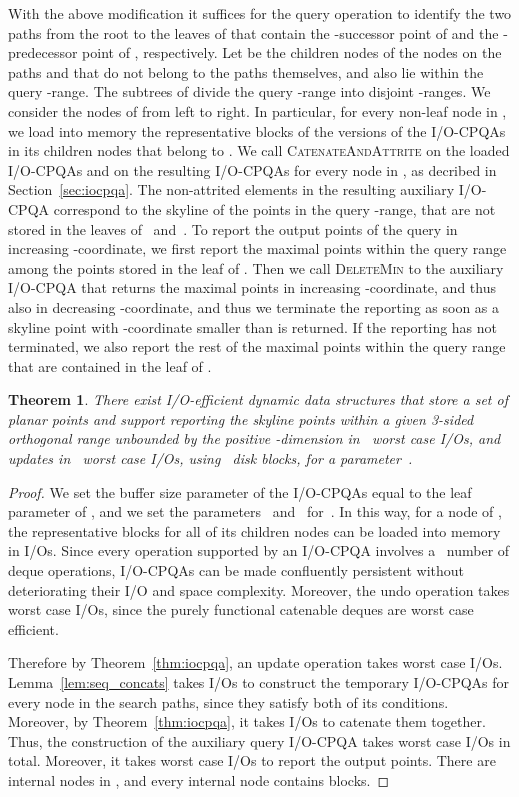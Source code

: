 \documentclass[]{article}
\newtheorem{theorem}{Theorem}[section]
\begin{document}
With the above modification it suffices for the query operation to identify the
two paths  from the root to the leaves of  that contain the
-successor point of  and the -predecessor point of ,
respectively. Let  be the children nodes of the nodes on the paths 
and  that do not belong to the paths themselves, and also lie within the
query -range. The subtrees of  divide the query -range into disjoint
-ranges. We consider the nodes of  from left to right. In particular,
for every non-leaf node in , we load into memory the
representative blocks of the versions of the I/O-CPQAs in its children nodes
that belong to . We call \textsc{CatenateAndAttrite} on the loaded I/O-CPQAs
and on the resulting I/O-CPQAs for every node in , as decribed
in Section~\ref{sec:iocpqa}. The non-attrited elements in the resulting
auxiliary I/O-CPQA correspond to the skyline of the points in the query
-range, that are not stored in the leaves of~ and~. To report
the output points of the query in increasing -coordinate, we first report the
maximal points within the query range among the points stored in the leaf of
. Then we call \textsc{DeleteMin} to the auxiliary I/O-CPQA that returns
the maximal points in increasing -coordinate, and thus also in decreasing
-coordinate, and thus we terminate the reporting as soon as a skyline point
with -coordinate smaller than  is returned. If the reporting has not
terminated, we also report the rest of the maximal points within the query range
that are contained in the leaf of .
\begin{theorem} \label{thm:3sided}
  There exist I/O-efficient dynamic data structures that store a set of 
  planar points and support reporting the  skyline points within a given
  3-sided orthogonal range unbounded by the positive -dimension in~ worst case I/Os, and updates
  in~ worst case I/Os, using~ disk blocks, for a parameter~.
\end{theorem}

\begin{proof}
  We set the buffer size parameter  of the I/O-CPQAs equal to the leaf
  parameter  of , and we set the parameters~ and~ for~.  In this way, for a node of ,
  the representative blocks for all of its children nodes can be loaded into
  memory in  I/Os. Since every operation supported by an I/O-CPQA
  involves a~ number of deque operations, I/O-CPQAs can be made
  confluently persistent without deteriorating their I/O and space complexity.
  Moreover, the undo operation takes  worst case I/Os, since the
  purely functional catenable deques are worst case efficient.

  Therefore by Theorem~\ref{thm:iocpqa}, an update operation takes  worst case I/Os. Lemma~\ref{lem:seq_concats} takes  I/Os to
  construct the temporary I/O-CPQAs for every node in the search paths, since
  they satisfy both of its conditions. Moreover, by Theorem~\ref{thm:iocpqa}, it
  takes  I/Os to
  catenate them together. Thus, the construction of the auxiliary query
  I/O-CPQA takes  worst case I/Os in total.
  Moreover, it takes  worst case I/Os to report
  the output points. There are  internal
  nodes in , and every internal node contains  blocks.
\end{proof}
\end{document}
